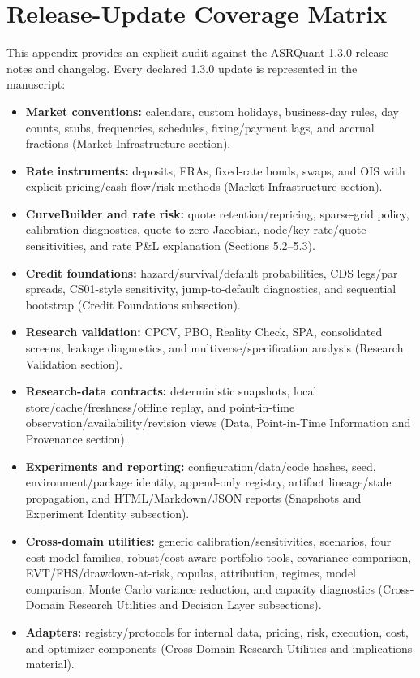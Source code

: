 \documentclass{asrpaper}
\begin{document}
\section{Release-Update Coverage Matrix}
This appendix provides an explicit audit against the ASRQuant 1.3.0 release notes and changelog. Every declared 1.3.0 update is represented in the manuscript:
\begin{itemize}[leftmargin=1.2em,itemsep=.20em,topsep=.25em]
\item \textbf{Market conventions:} calendars, custom holidays, business-day rules, day counts, stubs, frequencies, schedules, fixing/payment lags, and accrual fractions (Market Infrastructure section).
\item \textbf{Rate instruments:} deposits, FRAs, fixed-rate bonds, swaps, and OIS with explicit pricing/cash-flow/risk methods (Market Infrastructure section).
\item \textbf{CurveBuilder and rate risk:} quote retention/repricing, sparse-grid policy, calibration diagnostics, quote-to-zero Jacobian, node/key-rate/quote sensitivities, and rate P\&L explanation (Sections 5.2--5.3).
\item \textbf{Credit foundations:} hazard/survival/default probabilities, CDS legs/par spreads, CS01-style sensitivity, jump-to-default diagnostics, and sequential bootstrap (Credit Foundations subsection).
\item \textbf{Research validation:} CPCV, PBO, Reality Check, SPA, consolidated screens, leakage diagnostics, and multiverse/specification analysis (Research Validation section).
\item \textbf{Research-data contracts:} deterministic snapshots, local store/cache/freshness/offline replay, and point-in-time observation/availability/revision views (Data, Point-in-Time Information and Provenance section).
\item \textbf{Experiments and reporting:} configuration/data/code hashes, seed, environment/package identity, append-only registry, artifact lineage/stale propagation, and HTML/Markdown/JSON reports (Snapshots and Experiment Identity subsection).
\item \textbf{Cross-domain utilities:} generic calibration/sensitivities, scenarios, four cost-model families, robust/cost-aware portfolio tools, covariance comparison, EVT/FHS/drawdown-at-risk, copulas, attribution, regimes, model comparison, Monte Carlo variance reduction, and capacity diagnostics (Cross-Domain Research Utilities and Decision Layer subsections).
\item \textbf{Adapters:} registry/protocols for internal data, pricing, risk, execution, cost, and optimizer components (Cross-Domain Research Utilities and implications material).

\end{itemize}
\end{document}
